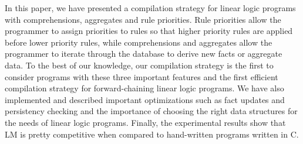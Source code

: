 In this paper, we have presented a compilation strategy for linear logic
programs with comprehensions, aggregates and rule priorities. Rule priorities
allow the programmer to assign priorities to rules so that higher priority rules
are applied before lower priority rules, while comprehensions and aggregates
allow the programmer to iterate through the database to derive new facts or
aggregate data. To the best of our knowledge, our compilation strategy is the
first to consider programs with these three important features and the first
efficient compilation strategy for forward-chaining linear logic programs.
We have also implemented and described important optimizations
such as fact updates and persistency checking and the importance of choosing the
right data structures for the needs of linear logic programs.
Finally, the experimental results show that LM is pretty competitive when
compared to hand-written programs written in C.

